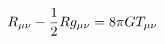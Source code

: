 \documentclass[preview]{standalone}
\begin{document}
\begin{align*}
\special{dvisvgm:raw <g id='unique000'>}R_{\mu\nu} - \frac{1}{2}Rg_{\mu\nu} = 8\pi G T_{\mu\nu}\special{dvisvgm:raw </g>}
\end{align*}
\end{document}
